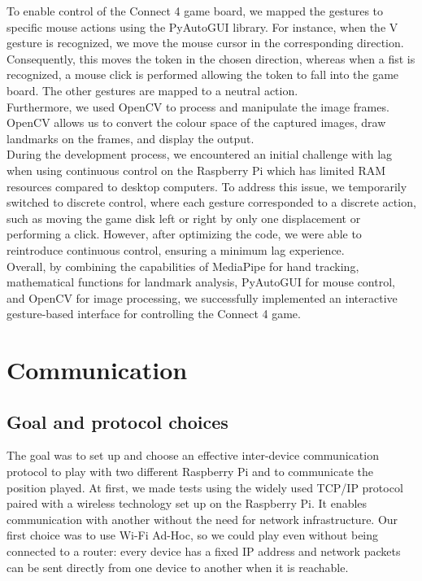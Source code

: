 \documentclass[11pt, a4paper, oneside]{report}
\begin{document}
	To enable control of the Connect 4 game board, we mapped the gestures to specific mouse actions using the PyAutoGUI library. For instance, when the V gesture is recognized, we move the mouse cursor in the corresponding direction. Consequently, this moves the token in the chosen direction, whereas when a fist is recognized, a mouse click is performed allowing the token to fall into the game board. The other gestures are mapped to a neutral action. \\

	Furthermore, we used OpenCV to process and manipulate the image frames. OpenCV allows us to convert the colour space of the captured images, draw landmarks on the frames, and display the output. \\

	During the development process, we encountered an initial challenge with lag when using continuous control on the Raspberry Pi which has limited RAM resources compared to desktop computers. To address this issue, we temporarily switched to discrete control, where each gesture corresponded to a discrete action, such as moving the game disk left or right by only one displacement or performing a click. However, after optimizing the code, we were able to reintroduce continuous control, ensuring a minimum lag experience. \\

	Overall, by combining the capabilities of MediaPipe for hand tracking, mathematical functions for landmark analysis, PyAutoGUI for mouse control, and OpenCV for image processing, we successfully implemented an interactive gesture-based interface for controlling the Connect 4 game. \\

	\section{Communication}
	\subsection{Goal and protocol choices}
	The goal was to set up and choose an effective inter-device communication protocol to play with two different Raspberry Pi and to communicate the position played. At first, we made tests using the widely used TCP/IP protocol paired with a wireless technology set up on the Raspberry Pi. It enables communication with another without the need for network infrastructure. Our first choice was to use Wi-Fi Ad-Hoc, so we could play even without being connected to a router: every device has a fixed IP address and network packets can be sent directly from one device to another when it is reachable. \\
\end{document}

